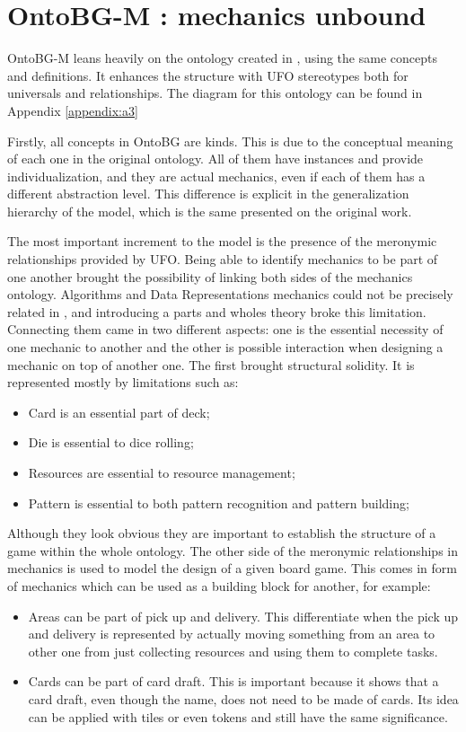 \section{OntoBG-M : mechanics unbound}

OntoBG-M leans heavily on the ontology created in \cite{kritz_buildingOntology}, using the same concepts and definitions. It enhances the structure with UFO stereotypes both for universals and relationships. The diagram for this ontology can be found in Appendix \autoref{appendix:a3}

Firstly, all  concepts in OntoBG are kinds. This is due to the conceptual meaning of each one in the original ontology. All of them have instances and provide individualization, and they are actual mechanics, even if each of them has a different abstraction level. This difference is explicit in the generalization hierarchy of the model, which is the same presented on the original work.


The most important increment to the model is the presence of the meronymic relationships provided by UFO. Being able to identify mechanics to be part of one another brought the possibility of linking both sides of the mechanics ontology. Algorithms and Data Representations mechanics could not be precisely related in \citet{kritz_buildingOntology}, and introducing a parts and wholes theory broke this limitation. Connecting them came in two different aspects: one is the essential necessity of one mechanic to another and the other is possible interaction when designing a mechanic on top of another one. The first brought structural solidity. It is represented mostly by limitations such as:

\begin{itemize}
    \item Card is an essential part of deck;
    \item Die is essential to dice rolling;
    \item Resources are essential to resource management;
    \item Pattern is essential to both pattern recognition and pattern building;
\end{itemize}

Although they look obvious they are important to establish the structure of a game within the whole ontology. The other side of the meronymic relationships in mechanics is used to model the design of a given board game. This comes in form of mechanics which can be used as a building block for another, for example:
\begin{itemize}
    \item Areas can be part of pick up and delivery. This differentiate when the pick up and delivery is represented by actually moving something from an area to other one from just collecting resources and using them to complete tasks.
    \item Cards can be part of card draft. This is important because it shows that a card draft, even though the name, does not need to be made of cards. Its idea can be applied with tiles or even tokens and still have the same significance.
\end{itemize} 

